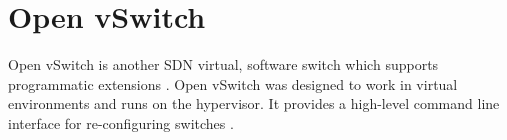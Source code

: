 \section{Open vSwitch}
\label{rel:vswitch}

Open vSwitch is another SDN virtual, software switch which supports programmatic extensions \cite{ovs_man_page, ovs2009extending, ovs2013}. Open vSwitch was designed to work in virtual environments and runs on the hypervisor. It provides a high-level command line interface for re-configuring switches \cite{ovs_man_page}.


